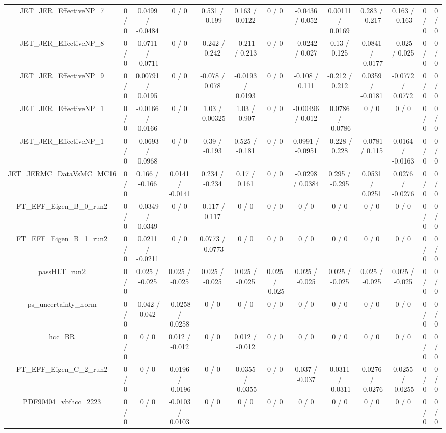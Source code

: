 \documentclass[10pt]{article}
\begin{document}
\begin{table}[htbp]
\begin{center}
\begin{tabular}{|c|c|c|c|c|c|c|c|c|c|c|c|c|}
  JET_JER_EffectiveNP_7 & 0 / 0 & 0.0499 / -0.0484 & 0 / 0 & 0.531 / -0.199 & 0.163 / 0.0122 & 0 / 0 & -0.0436 / 0.052 & 0.00111 / 0.0169 & 0.283 / -0.217 & 0.163 / -0.163 & 0 / 0 & 0 / 0 \\ 
  JET_JER_EffectiveNP_8 & 0 / 0 & 0.0711 / -0.0711 & 0 / 0 & -0.242 / 0.242 & -0.211 / 0.213 & 0 / 0 & -0.0242 / 0.027 & 0.13 / 0.125 & 0.0841 / -0.0177 & -0.025 / 0.025 & 0 / 0 & 0 / 0 \\ 
  JET_JER_EffectiveNP_9 & 0 / 0 & 0.00791 / 0.0195 & 0 / 0 & -0.078 / 0.078 & -0.0193 / 0.0193 & 0 / 0 & -0.108 / 0.111 & -0.212 / 0.212 & 0.0359 / -0.0181 & -0.0772 / 0.0772 & 0 / 0 & 0 / 0 \\ 
  JET_JER_EffectiveNP_1 & 0 / 0 & -0.0166 / 0.0166 & 0 / 0 & 1.03 / -0.00325 & 1.03 / -0.907 & 0 / 0 & -0.00496 / 0.012 & 0.0786 / -0.0786 & 0 / 0 & 0 / 0 & 0 / 0 & 0 / 0 \\ 
  JET_JER_EffectiveNP_1 & 0 / 0 & -0.0693 / 0.0968 & 0 / 0 & 0.39 / -0.193 & 0.525 / -0.181 & 0 / 0 & 0.0991 / -0.0951 & -0.228 / 0.228 & -0.0781 / 0.115 & 0.0164 / -0.0163 & 0 / 0 & 0 / 0 \\ 
  JET_JERMC_DataVsMC_MC16 & 0 / 0 & 0.166 / -0.166 & 0.0141 / -0.0141 & 0.234 / -0.234 & 0.17 / 0.161 & 0 / 0 & -0.0298 / 0.0384 & 0.295 / -0.295 & 0.0531 / 0.0251 & 0.0276 / -0.0276 & 0 / 0 & 0 / 0 \\ 
  FT_EFF_Eigen_B_0_run2 & 0 / 0 & -0.0349 / 0.0349 & 0 / 0 & -0.117 / 0.117 & 0 / 0 & 0 / 0 & 0 / 0 & 0 / 0 & 0 / 0 & 0 / 0 & 0 / 0 & 0 / 0 \\ 
  FT_EFF_Eigen_B_1_run2 & 0 / 0 & 0.0211 / -0.0211 & 0 / 0 & 0.0773 / -0.0773 & 0 / 0 & 0 / 0 & 0 / 0 & 0 / 0 & 0 / 0 & 0 / 0 & 0 / 0 & 0 / 0 \\ 
  passHLT_run2 & 0 / 0 & 0.025 / -0.025 & 0.025 / -0.025 & 0.025 / -0.025 & 0.025 / -0.025 & 0.025 / -0.025 & 0.025 / -0.025 & 0.025 / -0.025 & 0.025 / -0.025 & 0.025 / -0.025 & 0 / 0 & 0 / 0 \\ 
  ps_uncertainty_norm & 0 / 0 & -0.042 / 0.042 & -0.0258 / 0.0258 & 0 / 0 & 0 / 0 & 0 / 0 & 0 / 0 & 0 / 0 & 0 / 0 & 0 / 0 & 0 / 0 & 0 / 0 \\ 
  hcc_BR & 0 / 0 & 0 / 0 & 0.012 / -0.012 & 0 / 0 & 0.012 / -0.012 & 0 / 0 & 0 / 0 & 0 / 0 & 0 / 0 & 0 / 0 & 0 / 0 & 0 / 0 \\ 
  FT_EFF_Eigen_C_2_run2 & 0 / 0 & 0 / 0 & 0.0196 / -0.0196 & 0 / 0 & 0.0355 / -0.0355 & 0 / 0 & 0.037 / -0.037 & 0.0311 / -0.0311 & 0.0276 / -0.0276 & 0.0255 / -0.0255 & 0 / 0 & 0 / 0 \\ 
  PDF90404_vbfhcc_2223 & 0 / 0 & 0 / 0 & -0.0103 / 0.0103 & 0 / 0 & 0 / 0 & 0 / 0 & 0 / 0 & 0 / 0 & 0 / 0 & 0 / 0 & 0 / 0 & 0 / 0 \\ 

\end{tabular}
\end{center}
\end{table}
\end{document}
